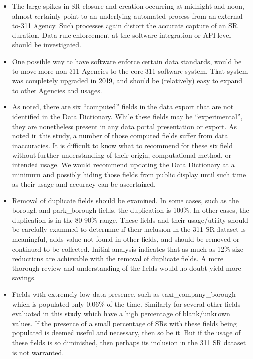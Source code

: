 \documentclass[12pt, titlepage]{article}
\begin{document}
\begin{itemize}
	\item The large spikes in SR closure and creation occurring at 
	midnight and noon, almost certainly point to an underlying automated 
	process from an external-to-311 Agency. Such processes again distort 
	the accurate capture of an SR duration. Data rule enforcement at the 
	software integration or API level should be investigated.

	\item One possible way to have software enforce certain data 
	standards, would be to move more non-311 Agencies to the core 
	311 software system. That system was completely upgraded in 
	2019, and should be (relatively) easy to expand to other 
	Agencies and usages.
	
	\item As noted, there are six ``computed'' fields in the data export 
	that are not identified in the Data Dictionary. While these fields may 
	be ``experimental'', they are nonetheless present in any data portal 
	presentation or export. As noted in this study, a number of those 
	computed fields suffer from data inaccuracies. It is difficult to know 
	what to recommend for these six field without further understanding of 
	their origin, computational method, or intended usage. We would 
	recommend updating the Data Dictionary at a minimum and 
	possibly hiding those fields from public display until such time as 
	their usage and accuracy can be ascertained.
	
	\item Removal of duplicate fields should be examined.  In some cases, such 
	as the borough and park\_borough fields, the duplication is 100\%. In 
	other cases, the duplication is in the 80-90\% range. These fields and 
	their usage/utility should be carefully examined to determine if 
	their inclusion in the 311 SR dataset is meaningful, adds value not found 
	in other fields, and should be removed or continued to be collected. Initial 
	analysis indicates that as much as 12\% size reductions are achievable 
	with the removal of duplicate fields. A more thorough review and 
	understanding of the fields would no doubt yield more savings. 
	
	\item Fields with extremely low data presence, such as taxi\_company\_borough 
	which is populated only 0.06\% of the time. Similarly for several other 
	fields evaluated in this study which have a high percentage of blank/unknown 
	values. If the presence of a small percentage of SRs with these fields 
	being populated is deemed useful and necessary, then so be it. But if 
	the usage of these fields is so diminished, then perhaps its inclusion 
	in the 311 SR dataset is not warranted.
	

\end{itemize}
\end{document}
